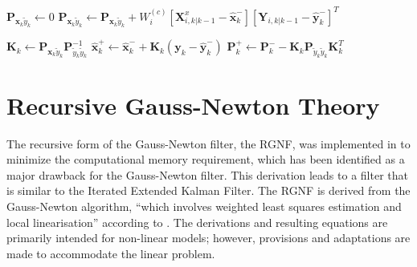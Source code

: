 \begin{algorithm}[H]
\begin{algorithmic}[1]
    \vspace{0.6em}
    \State $\mathbf{P}_{\mathbf{x}_k\tilde{y}_k} \gets 0$
        \vspace{0.3em}
        \State $\mathbf{P}_{\mathbf{x}_k\tilde{y}_k} 
 \gets \mathbf{P}_{\mathbf{x}_k\tilde{y}_k} + W^{(c)}_i \left[\mathbf{X}^x_{i,k|k-1} - \hat{\mathbf{x}}^-_k\right]\left[\mathbf{Y}_{i,k|k-1} - \hat{\mathbf{y}}^-_k\right]^T$
        \vspace{0.3em}
    \EndFor
    
    \vspace{0.6em}
    \State $\mathbf{K}_k \gets \mathbf{P}_{\mathbf{x}_k\tilde{y}_k} \mathbf{P}_{\tilde{y}_k\tilde{y}_k}^{-1}$
    \vspace{0.6em}
        \vspace{0.3em}
        \State $\hat{\mathbf{x}}^+_k \gets \hat{\mathbf{x}}^-_k + \mathbf{K}_k \left(\mathbf{y}_k - \hat{\mathbf{y}}^-_k\right)$
        \vspace{0.3em}
    \EndIf
    \vspace{0.6em}
    \State $\mathbf{P}^+_k \gets \mathbf{P}^-_k - \mathbf{K}_k \mathbf{P}_{\tilde{y}_k\tilde{y}_k} \mathbf{K}_k^T$
    \vspace{0.6em}
\end{algorithmic}
\end{algorithm}
\newpage
\section{Recursive Gauss-Newton Theory}

The recursive form of the Gauss-Newton filter, the \ac{RGNF}, was implemented in \cite{Inggs1} to minimize the computational memory requirement, which has been identified as a major drawback for the Gauss-Newton filter. This derivation leads to a filter that is similar to the Iterated Extended Kalman Filter. The \ac{RGNF} is derived from the Gauss-Newton algorithm, ``which involves weighted least squares estimation and local linearisation'' according to \cite{Inggs1}. The derivations and resulting equations are primarily intended for non-linear models; however, provisions and adaptations are made to accommodate the linear problem.
